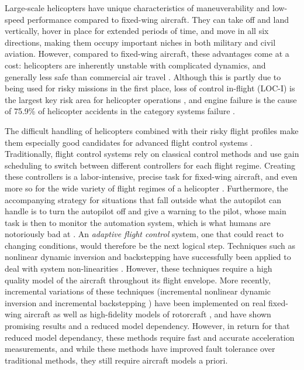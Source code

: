 Large-scale helicopters have unique characteristics of maneuverability and low-speed performance compared to fixed-wing aircraft. They can take off and land vertically, hover in place for extended periods of time, and move in all six directions, making them occupy important niches in both military and civil aviation. However, compared to fixed-wing aircraft, these advantages come at a cost: helicopters are inherently unstable with complicated dynamics, and generally less safe than commercial air travel \cite{IHST}. Although this is partly due to being used for risky missions in the first place, loss of control in-flight (LOC-I) is the largest key risk area for helicopter operations \cite{EASA}, and engine failure is the cause of 75.9\% of helicopter accidents in the category systems failure \cite{IHST}. 

 The difficult handling of helicopters combined with their risky flight profiles make them especially good candidates for advanced flight control systems \cite{Hu2017}. Traditionally, flight control systems rely on classical control methods and use gain scheduling to switch between different controllers for each flight regime. Creating these controllers is a labor-intensive, precise task for fixed-wing aircraft, and even more so for the wide variety of flight regimes of a helicopter \cite{Hu2017}. Furthermore, the accompanying strategy for situations that fall outside what the autopilot can handle is to turn the autopilot off and give a warning to the pilot, whose main task is then to monitor the automation system, which is what humans are notoriously bad at \cite{ironies}. An \emph{adaptive flight control} system, one that could react to changing conditions, would therefore be the next logical step. Techniques such as nonlinear dynamic inversion and backstepping have successfully been applied to deal with system non-linearities \cite{NDI, BS}. However, these techniques require a high quality model of the aircraft throughout its flight envelope. More recently, incremental variations of these techniques (incremental nonlinear dynamic inversion \cite{INDI} and incremental backstepping \cite{IBS}) have been implemented on real fixed-wing aircraft \cite{Pollack2019, Keijzer2019} as well as high-fidelity models of rotorcraft \cite{Simplicio2013}, and have shown promising results and a reduced model dependency. However, in return for that reduced model dependancy, these methods require fast and accurate acceleration measurements, and while these methods have improved fault tolerance over traditional methods, they still require aircraft models a priori. 

